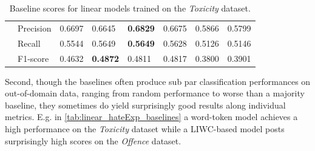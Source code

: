 \begin{table}[]
\begin{minipage}{0.42\paperheight}
{\begin{tabular}{ll|ll|ll|ll}
                                        & Precision & 0.6697 & 0.6645            & \bf{0.6829} & 0.6675      & 0.5866 & 0.5799          \\
                                        & Recall    & 0.5544 & 0.5649            & \bf{0.5649} & 0.5628      & 0.5126 & 0.5146          \\
                                        & F1-score  & 0.4632 & \bf{0.4872}       & 0.4811      & 0.4817      & 0.3800 & 0.3901
    \end{tabular}%
    }
    \caption{Baseline scores for linear models trained on the \textit{Toxicity} dataset.}
    \label{tab:linear_toxicity_baselines}
    \end{minipage}
\end{table}

Second, though the baselines often produce sub par classification performances on out-of-domain data, ranging from random performance to worse than a majority baseline, they sometimes do yield surprisingly good results along individual metrics. E.g. in \cref{tab:linear_hateExp_baselines} a word-token model achieves a high performance on the \textit{Toxicity} dataset while a LIWC-based model posts surprisingly high scores on the \textit{Offence} dataset.

